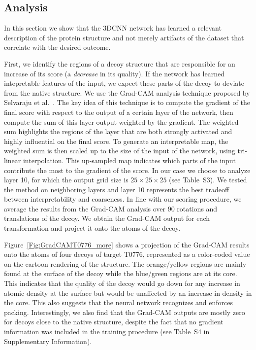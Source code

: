 \documentclass{bioinfo}
\begin{document}
\subsection{Analysis}

In this section we show that the 3DCNN network has learned a relevant
description of the protein structure and not merely artifacts of the
dataset that correlate with the desired outcome.

First, we identify the regions of a decoy structure that are
responsible for an increase of its score (a \emph{decrease} in its
quality). If the network has learned intepretable features of the
input, we expect these parts of the decoy to deviate from the native
structure.
%
We use the Grad-CAM analysis technique proposed by Selvaraju et
al.~\citep{selvaraju2016grad}. The key idea of this technique is to
compute the gradient of the final score with respect to the output of
a certain layer of the network, then compute the sum of this layer
output weighted by the gradient.
%
The weighted sum highlights the regions of the layer that are both
strongly activated and highly influential on the final score. To
generate an interpretable map, the weighted sum is then scaled up to
the size of the input of the network, using tri-linear interpolation.
%
This up-sampled map indicates which parts of the input contribute
the most to the gradient of the score.  In our case we choose to
analyze layer 10, for which the output grid size is $25\times 25\times
25$ (see Table~S3).  We tested the method on neighboring layers and
layer 10 represents the best tradeoff between interpretability and
coarseness.
%
In line with our scoring procedure, we average the results
from the Grad-CAM analysis over 90 rotations and translations of the
decoy. We obtain the Grad-CAM output for each transformation and
project it onto the atoms of the decoy.  

Figure~\ref{Fig:GradCAMT0776_more} shows a projection of the Grad-CAM
results onto the atoms of four decoys of target T0776, represented as
a color-coded value on the cartoon rendering of the structure.  The
orange/yellow regions are mainly found at the surface of the decoy
while the blue/green regions are at its core. This indicates that the
quality of the decoy would go down for any increase in atomic density
at the surface but would be unaffected by an increase in density in
the core. This also suggests that the neural network recognizes and
enforces packing.  Interestingly, we also find that the Grad-CAM
outputs are mostly zero for decoys close to the native structure,
despite the fact that no gradient information was included in the
training procedure (see Table~S4 in Supplementary Information).
\end{document}
